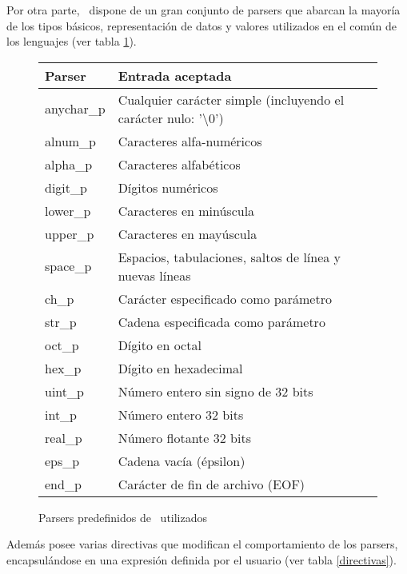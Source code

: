 Por otra parte, \spirit\ dispone de un gran conjunto de parsers que abarcan la mayoría de los tipos básicos, representación de datos y valores utilizados en el común de los lenguajes (ver tabla \ref{parsers}).

\begin{figure}[h!]\centering\scriptsize
\begin{tabular}{| l | l |}
\hline

\rowcolor{gris} \textbf{Parser} & \textbf{Entrada aceptada} \\ \hline

anychar\_p & Cualquier carácter simple (incluyendo el carácter nulo: '$\setminus0$')\\ \hline
alnum\_p   & Caracteres alfa-numéricos \\ \hline
alpha\_p   & Caracteres alfabéticos \\ \hline
digit\_p   & Dígitos numéricos \\ \hline
lower\_p   & Caracteres en minúscula \\ \hline
upper\_p   & Caracteres en mayúscula \\ \hline
space\_p   & Espacios, tabulaciones, saltos de línea y nuevas líneas \\ \hline
ch\_p      & Carácter especificado como parámetro \\ \hline
str\_p     & Cadena especificada como parámetro \\ \hline
oct\_p     & Dígito en octal \\ \hline
hex\_p     & Dígito en hexadecimal \\ \hline
uint\_p    & Número entero sin signo de 32 bits \\ \hline
int\_p     & Número entero 32 bits \\ \hline
real\_p    & Número flotante 32 bits \\ \hline
eps\_p     & Cadena vacía (épsilon) \\ \hline
end\_p     & Carácter de fin de archivo (EOF) \\ \hline
\end{tabular}
\caption{\label{parsers} Parsers predefinidos de \spirit\ utilizados} 
\end{figure}

Además posee varias directivas que modifican el comportamiento de los parsers, encapsulándose en una expresión definida por el usuario (ver tabla \ref{directivas}).

